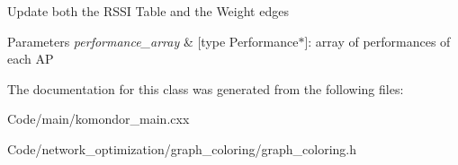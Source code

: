 Update both the R\+S\+SI Table and the Weight edges 
\begin{DoxyParams}{Parameters}
{\em performance\+\_\+array} & \mbox{[}type Performance$\ast$\mbox{]}\+: array of performances of each AP \\
\hline
\end{DoxyParams}


The documentation for this class was generated from the following files\+:\begin{DoxyCompactItemize}
\item 
Code/main/komondor\+\_\+main.\+cxx\item 
Code/network\+\_\+optimization/graph\+\_\+coloring/graph\+\_\+coloring.\+h\end{DoxyCompactItemize}
